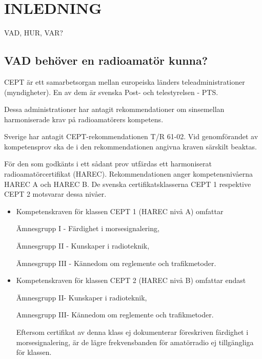 \chapter*{INLEDNING}

\Huge{VAD, HUR, VAR?}\normalsize

\section*{VAD behöver en radioamatör kunna?}

CEPT är ett samarbetsorgan mellan europeiska länders teleadministrationer (myndigheter). En av dem är svenska Post- och telestyrelsen - PTS.

Dessa administrationer har antagit rekommendationer om sinsemellan harmoniserade krav på radioamatörers kompetens.


Sverige har antagit CEPT-rekommendationen T/R 61-02. Vid genomförandet av
kompetensprov ska de i den rekommendationen angivna kraven särskilt beaktas.

\begin{rev-omarbetas}

För den som godkänts i ett sådant prov utfärdas ett harmoniserat radioamatörcertifikat
(HAREC). Rekommendationen anger kompetensnivåerna HAREC A och HAREC B. De svenska
certifikatsklasserna CEPT 1 respektive CEPT 2 motsvarar dessa nivåer.

\begin{itemize}
\item Kompetenskraven för klassen CEPT 1
(HAREC nivå A) omfattar

Ämnesgrupp I - Färdighet i morsesignalering,

Ämnesgrupp II - Kunskaper i radioteknik,

Ämnesgrupp III - Kännedom om reglemente och trafikmetoder.

\item Kompetenskraven för klassen CEPT 2
(HAREC nivå B) omfattar endast

Ämnesgrupp II- Kunskaper i radioteknik,

Amnesgrupp III- Kännedom om reglemente och trafikmetoder.

Eftersom certifikat av denna klass ej dokumenterar föreskriven färdighet i
morsesignalering, är de lägre frekvensbanden för amatörradio ej tillgängliga för klassen.
\end{itemize}

\end{rev-omarbetas}

